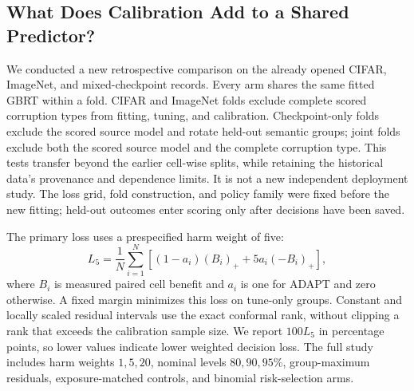 \subsection{What Does Calibration Add to a Shared Predictor?}
\label{sec:nextphase-calibration}

We conducted a new retrospective comparison on the already opened CIFAR, ImageNet,
and mixed-checkpoint records. Every arm shares the same fitted GBRT within a fold.
CIFAR and ImageNet folds exclude complete scored corruption types from fitting,
tuning, and calibration. Checkpoint-only folds exclude the scored source model
and rotate held-out semantic groups; joint folds exclude both the scored source
model and the complete corruption type.
This tests transfer beyond the earlier cell-wise splits, while retaining the historical
data's provenance and dependence limits. It is not a new independent deployment study.
The loss grid, fold construction, and policy family were fixed before the new fitting;
held-out outcomes enter scoring only after decisions have been saved.

The primary loss uses a prespecified harm weight of five:
\begin{equation}
 L_5=\frac{1}{N}\sum_{i=1}^N
 \left[(1-a_i)(B_i)_+ +5a_i(-B_i)_+\right],
 \label{eq:nextphase-loss}
\end{equation}
where $B_i$ is measured paired cell benefit and $a_i$ is one for ADAPT and zero
otherwise. A fixed margin minimizes this loss
on tune-only groups. Constant and locally scaled residual intervals use the exact
conformal rank, without clipping a rank that exceeds the calibration sample size.
We report $100L_5$ in percentage points, so lower values indicate lower weighted decision loss.
The full study includes harm weights $1,5,20$, nominal levels $80,90,95\%$,
group-maximum residuals, exposure-matched controls, and binomial risk-selection arms.

\begin{table}[t]
\centering
\small
\caption{Retrospective shared-predictor comparison. Losses are $100L_5$ in percentage
points (lower is better). Margin is selected on tuning data; Constant and Scaled
use nominal 90\% cell residual intervals. Inclusion C/S is observed held-out
interval inclusion for those two arms, not a coverage guarantee. The same 108
mixed-checkpoint records appear in two evaluation designs; they are not 216 independent observations.}
\label{tab:nextphase-calibration}
\resizebox{\textwidth}{!}{}
\end{table}

